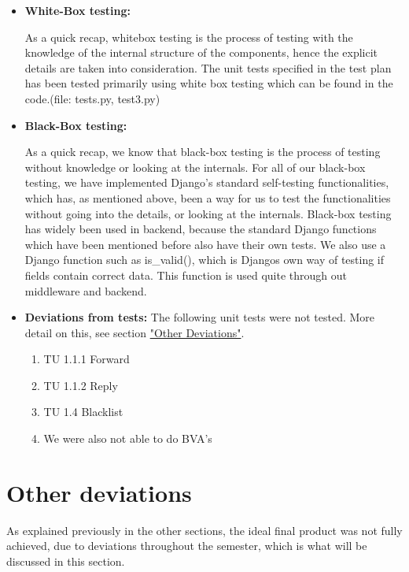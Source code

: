 \documentclass{article}
\begin{document}
\begin{itemize}
    \item \textbf{White-Box testing:}
    
    As a quick recap, whitebox testing is the process of testing with the knowledge of the internal structure of the components, hence the explicit details are taken into consideration. The unit tests specified in the test plan has been tested primarily using white box testing which can be found in the code.(file: tests.py, test3.py)
    \item \textbf{Black-Box testing:}
    
    As a quick recap, we know that black-box testing is the process of testing without knowledge or looking at the internals. For all of our black-box testing, we have implemented Django's standard self-testing functionalities, which has, as mentioned above, been a way for us to test the functionalities without going into the details, or looking at the internals. Black-box testing has widely been used in backend, because the standard Django functions which have been mentioned before also have their own tests. We also use a Django function such as is\_valid(), which is Djangos own way of testing if fields contain correct data. This function is used quite through out middleware and backend.
    
    \item \textbf{Deviations from tests:}
    The following unit tests were not tested. More detail on this, see section \hyperref[sec:deviations]{"Other Deviations"}.
    \begin{enumerate}
        \item TU 1.1.1 Forward
        \item TU 1.1.2 Reply
        \item TU 1.4 Blacklist
        \item We were also not able to do BVA's
    \end{enumerate}
\end{itemize}

\section*{Other deviations}

\label{sec:deviations}
As explained previously in the other sections, the ideal final product was not fully achieved, due to deviations throughout the semester, which is what will be discussed in this section.
\end{document}
